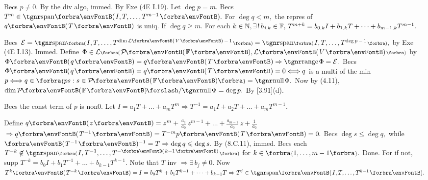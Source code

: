 Becs $p\neq 0.$ By the div algo, immed.  \;\;\Or By Exe (4E I.19).\PfEnd\vspace{2pt}\parSol{}
\Or Let $\deg p=m.$ Becs $T^{m}\in\Span{I,T,\dots,T^{m-1}}.$ For $\deg q<m,$ the repres of $q\Par{T}$ is uniq.\parSol{}
If $\deg q\geqslant m.$ For each $k\in{\mathbb{N}},\exists\,!\,b_{j,k}\in{\mathbb{F}},\,T^{m+k}=b_{0,k}I+b_{1,k}T+\dots+b_{m-1,k}T^{m-1}.$\PfEnd
\SepLine[0pt][\Blind{\BulletPointX} ]

Becs $\mE=\Span[\BigPar]{I,T,\dots,T^{\dim\Lm[\SmallPar]{V}\,-\,1}}=\Span[\BigPar]{I,T,\dots,T^{\deg p\,-\,1}},$ by Exe (4E I.13). Immed.\PfEnd\vspace{2pt}\parSol{}
\Or Define $\Phi\in\Lm[\BigPar]{\PoFi,\Lm{V}}$ by $\Phi\Par{q}=q\Par{T}\Rightarrow\range\Phi=\mE.$\parSol{}
Becs $\Phi\Par{q}=q\Par{T}=0\Longleftrightarrow q$ is a multi of the min $p\Longleftrightarrow q\in\Bra{ps:s\in\PoFi}=\null\Phi.$\parSol{}
Now by (4.11), $\dim\PoFi\XSlash\null\Phi=\deg p.$ By [3.91](d).\PfEnd
\SepLine[0pt][\Blind{\BulletPointX} ]

Becs the const term of $p$ is non0. Let $I=a_1T+\dots+a_mT^m\Rightarrow T^{-1}=a_1I+a_2T+\dots+a_mT^{m-1}.$\PfEnd
\SepLine[0pt][\Blind{\BulletPointX} ]

Define $q\Par{z}=z^m+{}${\Large$\frac{a_1}{a_0}$}$\,z^{m-1}+\dots+{}${\Large$\frac{a_{m-1}}{a_0}$}$\,z+{}${\Large$\frac{1}{a_0}$}${}\Rightarrow q\Par{T^{-1}}=T^{-m}p\Par{T}=0.$\PfEnd\vspace{2pt}\parSol{}
Becs $\deg s\leqslant\deg q,$ while $\Par{T^{-1}}{^{-1}}=T\Rightarrow\deg q\leqslant\deg s.$ \;\Or By (8.C.11), immed.\PfEnd\vspace{4pt}\parSol{}
\Or Becs each $T^{-k}\not\in\Span[\BigPar]{I,T^{-1},\dots,T^{-\SmallPar{k-1}}}$ for $k\in\Bra{1,\dots,m-1}.$ Done.\parSol{}
For if not, supp $T^{-k}=b_0 I+b_1 T^{-1}+\dots+b_{k-1}T^{k-1}.$ Note that $T$ inv $\Rightarrow\exists\,b_j\neq 0.$\parSol{}
Now $T^k\Par{T^{-k}}=I=b_0 T^k+b_1 T^{k-1}+\dots+b_{k-1}T\Rightarrow T^j\in\Span{I,T,\dots,T^{k-1}}.$\PfEnd
\SepLine[0pt][\Blind{\BulletPointX} ]

